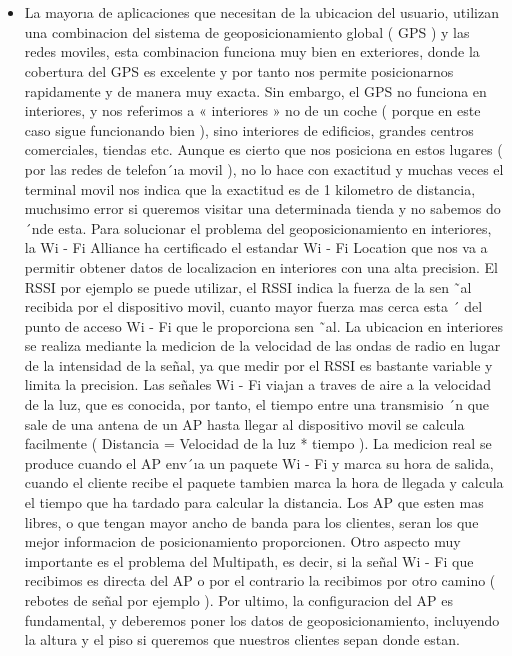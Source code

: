 \documentclass[conference,compsoc,onecolumn]{IEEEtran}
\begin{document}
\\
\\
\begin{itemize}

    \item La mayorıa de aplicaciones que necesitan de la ubicacion del usuario, utilizan una combinacion del sistema de geoposicionamiento global ( GPS ) y las redes moviles, esta combinacion funciona muy bien en exteriores, donde  la  cobertura  del  GPS  es  excelente  y  por  tanto  nos  permite  posicionarnos  rapidamente  y  de  manera muy exacta. Sin embargo, el GPS no funciona en interiores, y nos referimos a «  interiores »  no de un coche  ( porque en este caso sigue funcionando bien ), sino interiores de edificios, grandes centros comerciales, tiendas  etc.  Aunque  es  cierto  que  nos  posiciona  en  estos  lugares  (  por  las  redes  de  telefon´ıa  movil  ),  no lo  hace  con  exactitud  y  muchas  veces  el  terminal  movil  nos  indica  que  la  exactitud  es  de  1  kilometro de  distancia,  muchısimo  error  si  queremos  visitar  una  determinada  tienda  y  no  sabemos  do ´nde  esta.  Para solucionar el problema del geoposicionamiento en interiores, la Wi - Fi Alliance ha certificado el estandar Wi - Fi Location que nos va a permitir obtener datos de localizacion en interiores con una alta precision. El RSSI por ejemplo se puede utilizar, el RSSI indica la fuerza de la sen ˜al recibida por el dispositivo movil, cuanto mayor fuerza mas cerca esta ´  del punto de acceso Wi - Fi que le proporciona sen ˜al. La ubicacion en interiores  se  realiza  mediante  la  medicion  de  la  velocidad  de  las  ondas  de  radio  en  lugar  de  la  intensidad de la señal, ya que medir por el RSSI es bastante variable y limita la precision. Las señales Wi - Fi viajan a  traves  de  aire  a  la  velocidad  de  la  luz,  que  es  conocida,  por  tanto,  el  tiempo  entre  una  transmisio ´n  que sale de una antena de un AP hasta llegar al dispositivo movil se calcula facilmente ( Distancia = Velocidad de  la  luz  *  tiempo  ).  La  medicion  real  se  produce  cuando  el  AP  env´ıa  un  paquete  Wi  -  Fi  y  marca  su hora  de  salida,  cuando  el  cliente  recibe  el  paquete  tambien  marca  la  hora  de  llegada  y  calcula  el  tiempo que  ha  tardado  para  calcular  la  distancia.  Los  AP  que  esten  mas  libres,  o  que  tengan  mayor  ancho  de banda  para  los  clientes,  seran  los  que  mejor  informacion  de  posicionamiento  proporcionen.  Otro  aspecto muy importante es el problema del Multipath, es decir, si la señal Wi - Fi que recibimos es directa del AP o por el contrario la recibimos por otro camino ( rebotes de señal por ejemplo ). Por ultimo, la configuracion del AP es fundamental, y deberemos poner los datos de geoposicionamiento, incluyendo la altura y el piso si queremos que nuestros clientes sepan donde estan. 

\end{itemize}
\end{document}
